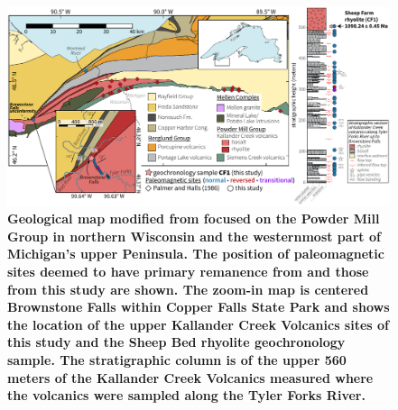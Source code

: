 \documentclass[11pt,letterpaper]{article}
\begin{document}
\begin{figure}[!h]
\centering
\includegraphics[width=6.5 in]{Figures/Fig8_PMG_map.pdf}
\caption{\small{\textbf{Geological map modified from \cite{Cannon1996a} focused on the Powder Mill Group in northern Wisconsin and the westernmost part of Michigan's upper Peninsula. The position of paleomagnetic sites deemed to have primary remanence from \cite{Palmer1986a} and those from this study are shown. The zoom-in map is centered Brownstone Falls within Copper Falls State Park and shows the location of the upper Kallander Creek Volcanics sites of this study and the Sheep Bed rhyolite geochronology sample. The stratigraphic column is of the upper 560 meters of the Kallander Creek Volcanics measured where the volcanics were sampled along the Tyler Forks River.}}}
\label{fig:PMG_Map}
\end{figure}
\end{document}
